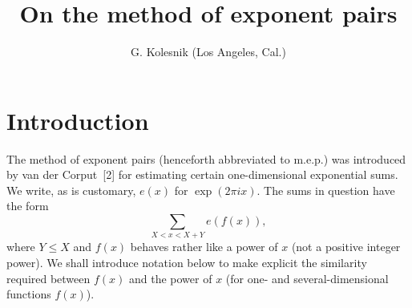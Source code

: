 \documentclass[10pt]{article}
\title{On the method of exponent pairs}
\author{G. Kolesnik (Los Angeles, Cal.)}
\date{}
\begin{document}
\maketitle

\section{Introduction}

The method of exponent pairs (henceforth abbreviated to m.e.p.) was introduced by van der Corput~[2] for estimating certain one-dimensional exponential sums. We write, as is customary, $e(x)$ for $\exp(2\pi i x)$. The sums in question have the form
\[
  \sum_{X<x<X+Y} e(f(x)),
\]
where $Y\leqslant X$ and $f(x)$ behaves rather like a power of $x$ (not a positive integer power). We shall introduce notation below to make explicit the similarity required between $f(x)$ and the power of $x$ (for one- and several-dimensional functions $f(x)$).
\end{document}
